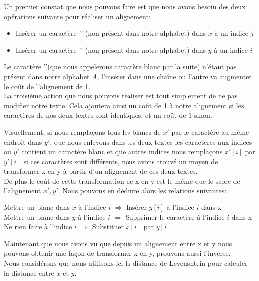 \documentclass{article}
\begin{document}
Un premier constat que nous pouvons faire est que nous avons besoin des deux
opérations suivante pour réaliser un alignement:
\begin{itemize}
	\item Insérer un caractère '\textvisiblespace' (non présent dans notre
		alphabet) dans $x$ à un indice $j$
	\item Insérer un caractère '\textvisiblespace' (non présent dans notre
		alphabet) dans $y$ à un indice $i$
\end{itemize}

Le caractère '\textvisiblespace'(que nous appelerons caractère blanc par la
suite) n'étant pas présent dans notre alphabet $A$, l'insérer dans une chaîne
ou l'autre va augmenter le coût de l'alignement de 1.\\

La troisième action que nous pouvons réaliser est tout simplement de ne pas
modifier notre texte. Cela ajoutera ainsi un coût de 1 à notre alignement si
les caractères de nos deux textes sont identiques, et un coût de 1 sinon.

Visuellement, si nous remplaçons tous les blancs de $x'$ par le caractère au
même endroit dans $y'$, que nous enlevons dans les deux textes les caractères
aux indices ou $y'$ contient un caractère blanc et que autres indices nous
remplaçons $x'[i]$ par $y'[i]$ si ces caractères sont différents, nous avons
trouvé un moyen de transformer x en y à partir d'un alignement de ces deux
textes.\\
De plus le coût de cette transformation de x en y est le même que le score de
l'alignement $x', y'$.
Nous pouvons en déduire alors les relations suivantes:

\begin{center}
	Mettre un blanc dans $x$ à l'indice $i$ $\Rightarrow$ Insérer $y[i]$ à
	l'indice $i$ dans x \\
	Mettre un blanc dans $y$ à l'indice $i$ $\Rightarrow$ Supprimer le
	caractère à l'indice $i$ dans x \\
	Ne rien faire à l'indice $i$ $\Rightarrow$ Substituer $x[i]$ par $y[i]$
\end{center}

Maintenant que nous avons vu que depuis un alignement entre x et y nous pouvons
obtenir une façon de transformer x en y, prouvons aussi l'inverse.\\

Nous considérons que nous utilisons ici la distance de Levenshtein pour
calculer la distance entre $x$ et $y$.\\
\end{document}
